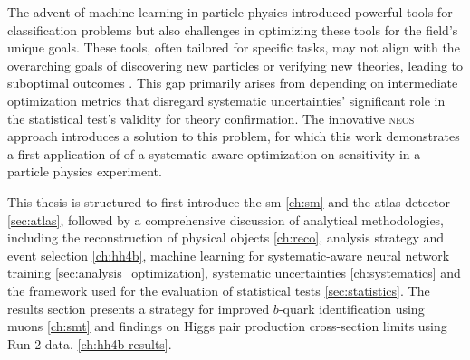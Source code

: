 The advent of machine learning in particle physics introduced powerful tools for classification problems but also challenges in optimizing these tools for the field's unique goals. These tools, often tailored for specific tasks, may not align with the overarching goals of discovering new particles or verifying new theories, leading to suboptimal outcomes \citep{guest2018deep}.
This gap primarily arises from depending on intermediate optimization metrics that disregard systematic uncertainties' significant role in the statistical test's validity for theory confirmation. The innovative \textsc{neos} approach \citep{Simpson_2023} introduces a solution to this problem, for which this work demonstrates a first application of of a systematic-aware optimization on sensitivity in a particle physics experiment.

This thesis is structured to first introduce the \ac{sm} \ref{ch:sm} and the \ac{atlas} detector \ref{sec:atlas}, followed by a comprehensive discussion of analytical methodologies, including the reconstruction of physical objects \ref{ch:reco}, analysis strategy and event selection \ref{ch:hh4b}, machine learning for systematic-aware neural network training \ref{sec:analysis_optimization}, systematic uncertainties \ref{ch:systematics} and the framework used for the evaluation of statistical tests \ref{sec:statistics}. The results section presents a strategy for improved $b$-quark identification using muons \ref{ch:smt} and findings on Higgs pair production cross-section limits using Run 2 data. \ref{ch:hh4b-results}.












